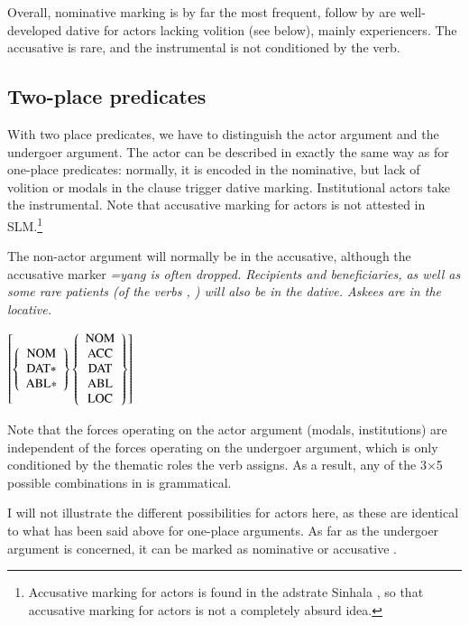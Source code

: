 \documentclass[a4paper,10pt]{article}
\begin{document}
Overall, nominative marking is by far the most frequent, follow by are well-developed dative for actors lacking volition (see below), mainly experiencers. The accusative is rare, and the instrumental is not conditioned by the verb.

\subsection{Two-place predicates}\label{sec:argstr:Two-placepredicates}
With two place predicates, we have to distinguish the actor argument and the undergoer argument. The actor can be described in exactly the same way as for one-place predicates: normally, it is encoded in the nominative, but lack of volition or modals in the clause trigger dative marking. Institutional actors take the instrumental. Note that accusative marking for actors is not attested in SLM.\footnote{Accusative marking for actors is found in the adstrate Sinhala \citep[791]{Gair2003}, so that accusative marking for actors is not a completely absurd idea.}

The non-actor argument will normally be in the accusative, although the accusative marker \em =yang \em is often dropped. Recipients and beneficiaries, as well as some rare patients (of the verbs ,  ) will also be in the dative. Askees are in the locative.

\ea \label{ex:twoplaceschema}
$\left[
\left\{
 \begin{array}{c}
  \rm NOM\\
  \rm DAT*\\
  \rm ABL*
 \end{array}
\right\}
\left\{
 \begin{array}{c}
  \rm NOM\\ 
  \rm ACC \\ 
  \rm DAT \\ 
  \rm ABL \\
  \rm LOC 
 \end{array}
 \right\}
\right]
$
\z

Note that the forces operating on the actor argument (modals, institutions) are independent of the forces operating on the undergoer argument, which is only conditioned by the thematic roles the verb assigns. As a result, any of the 3$\times$5 possible combinations in  is grammatical.

I will not illustrate the different possibilities for actors here, as these are identical to what has been said above for one-place arguments. As far as the undergoer argument is concerned, it can be marked as 
nominative  or 
accusative .
\end{document}
